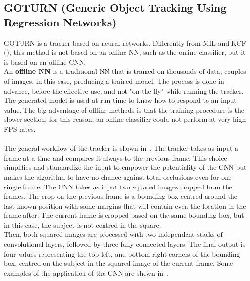 \subsection{GOTURN (Generic Object Tracking Using Regression Networks)} \label{sec:goturn}
GOTURN\cite{goturn} is a tracker based on neural networks. Differently from MIL and KCF (), this method is not based on an online NN, such as the online classifier, but it is based on an offline CNN.\\
An \textbf{offline NN} is a traditional NN that is trained on thousands of data, couples of images, in this case, producing a trained model. The process is done in advance, before the effective use, and not "on the fly" while running the tracker. The generated model is used at run time to know how to respond to an input value. The big advantage of offline methods is that the training procedure is the slower section, for this reason, an online classifier could not perform at very high FPS rates.\\
\\
The general workflow of the tracker is shown in~. The tracker takes as input a frame at a time and compares it always to the previous frame. This choice simplifies and standardize the input to empower the potentiality of the CNN but makes the algorithm to have no chance against total occlusions even for one single frame. The CNN takes as input two squared images cropped from the frames. The crop on the previous frame is a bounding box centred around the last known position with some margins that will contain even the location in the frame after. The current frame is cropped based on the same bounding box, but in this case, the subject is not centred in the square.\\
Then, both squared images are processed with two independent stacks of convolutional layers, followed by three fully-connected layers. The final output is four values representing the top-left, and bottom-right corners of the bounding box, centred on the subject in the squared image of the current frame. Some examples of the application of the CNN are shown in~.

